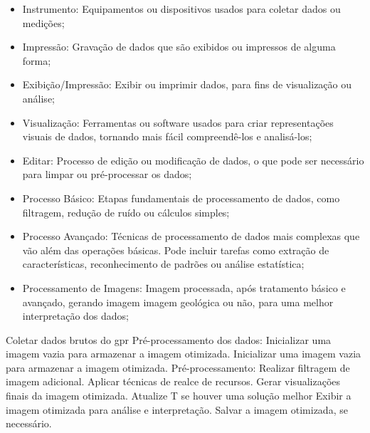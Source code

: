 \begin{itemize}
    \item Instrumento: Equipamentos ou dispositivos usados para coletar dados ou medições;
    \item Impressão: Gravação de dados que são exibidos ou impressos de alguma forma;
    \item Exibição/Impressão: Exibir ou imprimir dados, para fins de visualização ou análise;
    \item Visualização: Ferramentas ou software usados para criar representações visuais de dados, tornando mais fácil compreendê-los e analisá-los;
    \item Editar: Processo de edição ou modificação de dados, o que pode ser necessário para limpar ou pré-processar os dados;
    \item Processo Básico: Etapas fundamentais de processamento de dados, como filtragem, redução de ruído ou cálculos simples;
    \item Processo Avançado: Técnicas de processamento de dados mais complexas que vão além das operações básicas. Pode incluir tarefas como extração de características, reconhecimento de padrões ou análise estatística;
    \item Processamento de Imagens: Imagem processada, após tratamento básico e avançado, gerando imagem imagem geológica ou não, para uma melhor interpretação dos dados;
    
\end{itemize}

\begin{algorithm}[H]
  \caption{Pseudocódigo da Coletar e Processamento de dados brutos do \ac{gpr}.}
  \label{alg:pgpr}
  \SetAlgoLined
  \begin{algorithmic}[1]
    \STATE Coletar dados brutos do \ac*{gpr}
    \STATE Pré-processamento dos dados:
    \STATE Inicializar uma imagem vazia para armazenar a imagem otimizada.
    \STATE Inicializar uma imagem vazia para armazenar a imagem otimizada.
    \ENDFOR
    \STATE Pré-processamento:
    \STATE Realizar filtragem de imagem adicional.
    \STATE Aplicar técnicas de realce de recursos.
    \STATE Gerar visualizações finais da imagem otimizada.
    \STATE Atualize T se houver uma solução melhor
    \STATE Exibir a imagem otimizada para análise e interpretação.
    \STATE Salvar a imagem otimizada, se necessário.
    \STATE {}
  \end{algorithmic}
\end{algorithm}

